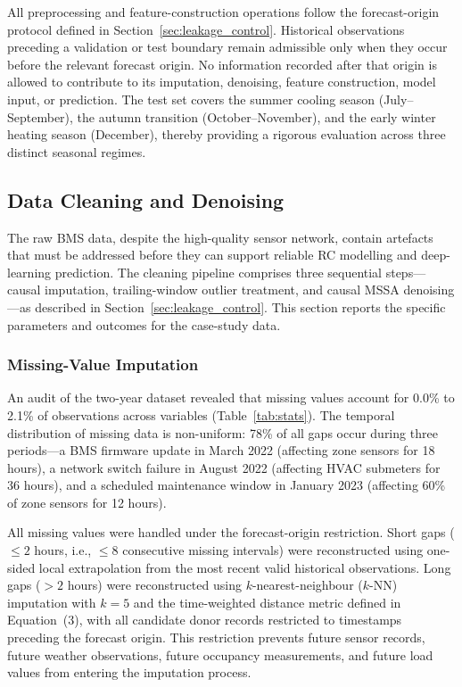 \documentclass[11pt]{article}
\begin{document}
All preprocessing and feature-construction operations follow the forecast-origin protocol defined in Section~\ref{sec:leakage_control}. Historical observations preceding a validation or test boundary remain admissible only when they occur before the relevant forecast origin. No information recorded after that origin is allowed to contribute to its imputation, denoising, feature construction, model input, or prediction. The test set covers the summer cooling season (July--September), the autumn transition (October--November), and the early winter heating season (December), thereby providing a rigorous evaluation across three distinct seasonal regimes.

\subsection{Data Cleaning and Denoising}

The raw BMS data, despite the high-quality sensor network, contain artefacts that must be addressed before they can support reliable RC modelling and deep-learning prediction. The cleaning pipeline comprises three sequential steps—causal imputation, trailing-window outlier treatment, and causal MSSA denoising—as described in Section~\ref{sec:leakage_control}. This section reports the specific parameters and outcomes for the case-study data.

\subsubsection{Missing-Value Imputation}

An audit of the two-year dataset revealed that missing values account for 0.0\% to 2.1\% of observations across variables (Table~\ref{tab:stats}). The temporal distribution of missing data is non-uniform: 78\% of all gaps occur during three periods---a BMS firmware update in March 2022 (affecting zone sensors for 18 hours), a network switch failure in August 2022 (affecting HVAC submeters for 36 hours), and a scheduled maintenance window in January 2023 (affecting 60\% of zone sensors for 12 hours).

All missing values were handled under the forecast-origin restriction. Short gaps ($\leq 2$ hours, i.e., $\leq 8$ consecutive missing intervals) were reconstructed using one-sided local extrapolation from the most recent valid historical observations. Long gaps ($>2$ hours) were reconstructed using $k$-nearest-neighbour ($k$-NN) imputation with $k=5$ and the time-weighted distance metric defined in Equation~(3), with all candidate donor records restricted to timestamps preceding the forecast origin. This restriction prevents future sensor records, future weather observations, future occupancy measurements, and future load values from entering the imputation process.
\end{document}
